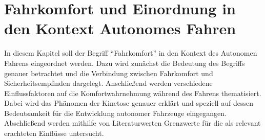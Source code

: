 \chapter{Fahrkomfort und Einordnung in den Kontext Autonomes Fahren}\label{cha:Komfort}
In diesem Kapitel soll der Begriff ``Fahrkomfort'' in den Kontext des Autonomen Fahrens eingeordnet werden. Dazu wird zunächst die Bedeutung des Begriffs genauer betrachtet und die Verbindung zwischen Fahrkomfort und Sicherheitsempfinden dargelegt. Anschließend werden verschiedene Einflussfaktoren auf die Komfortwahrnehmung während des Fahrens thematisiert. Dabei wird das Phänomen der Kinetose genauer erklärt und speziell auf dessen Bedeutsamkeit für die Entwicklung autonomer Fahrzeuge eingegangen. Abschließend werden mithilfe von Literaturwerten Grenzwerte für die als relevant erachteten Einflüsse untersucht. 

